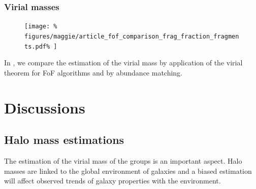 \subsubsection{Virial masses}
%
\begin{figure}[htb]
    \centering
    \begin{minipage}{0.49\linewidth}
        \texttt{[image: \%
            figures/maggie/article\_fof\_comparison\_frag\_fraction\_fragments.pdf\%
        ]}
    \end{minipage}
    \begin{minipage}{0.49\linewidth}
        \begin{minipage}{\linewidth}
        \end{minipage}
        \begin{minipage}{\linewidth}
        \end{minipage}
    \end{minipage}
\end{figure}

In , we compare the estimation of
the virial mass by application of the virial theorem for FoF algorithms and by
abundance matching.

\section{Discussions}
\label{sec:maggie_discussions}

\subsection{Halo mass estimations}
\label{sec:hmf_test}

The estimation of the virial mass of the groups is an important aspect. Halo
masses are linked to the global environment of galaxies and a biased
estimation will affect observed trends of galaxy properties with the
environment.

